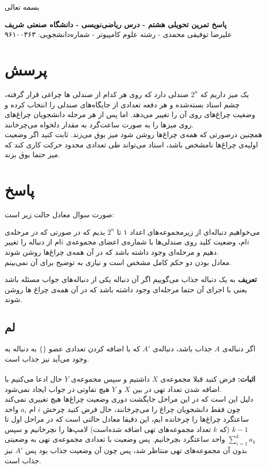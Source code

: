 \documentclass[12pt,a4paper]{article}
\begin{document}
\begin{center}
	بسمه تعالی
\end{center}
\begin{center}
	\textbf{پاسخ تمرین تحویلی هشتم - درس ریاضی‌نویسی - دانشگاه صنعتی شریف}
	\\
	علیرضا توفیقی محمدی - رشته علوم کامپیوتر - شماره‌دانشجویی: ۹۶۱۰۰۳۶۳
\end{center}
\section*{پرسش}
یک میز داریم که $2^n$ صندلی دارد که روی هر کدام از صندلی ها چراغی قرار گرفته، چشم استاد بسته‌شده و هر دفعه تعدادی از جایگاه‌های صندلی را انتخاب کرده و وضغیت چراغ‌های روی آن را تغییر می‌دهد. اما پس از هر مرحله دانشجویان چراغ‌های روی میزها را به صورت ساعت‌گرد به مقدار دلخواه می‌چرخانند.\\
همچنین درصورتی که همه‌ی چراغ‌ها روشن شود میز بوق می‌زند. ثابت کنید اگر وضعیت اولیه‌ی چراغ‌ها نامشخص باشد، استاد می‌تواند طی تعدادی محدود حرکت کاری کند که میز حتما بوق بزند.
\section*{پاسخ}
صورت سوال معادل حالت زیر است:

 می‌خواهیم دنباله‌ای از زیرمجموعه‌های اعداد ۱ تا 
$2^n$
بدیم که در صورتی که در مرحله‌ی $i$ام، وضعیت کلید روی صندلی‌ها با شماره‌ی اعضای مجموعه‌ی $i$ام از دنباله را تغییر دهیم و مرحله‌ای وجود داشته باشد که در آن همه‌ی چراغ‌ها روشن شوند.
\\
معادل بودن دو حکم کامل مشخص است و نیازی به توضیح برای آن نمی‌بینم.

\textbf{تعریف}
به یک دنباله جذاب می‌گوییم اگر آن دنباله یکی از دنباله‌های جواب مسئله باشد یعنی با اجرای آن حتما مرحله‌ای وجود داشته باشد که در آن همه‌ی چراغ ها روشن شوند.
\\
\subsection*{لم}
اگر دنباله‌ی $A$ جذاب باشد، دنباله‌ی $A'$ که با اضافه کردن تعدادی عضو $\{\}$ به دنباله به وجود می‌آید نیز جذاب است.
\\
\\
\textbf{اثبات:}
فرض کنید قبلا مجموعه‌ی $X$ داشتیم و سپس مجموعه‌ی $Y$ حال ادعا می‌کنیم با اضافه شدن تعداد تهی در بین $X$ و $Y$ هیچ تفاوتی در جواب ایجاد نمی‌شود.
\\
دلیل این است که در این مراحل جایگشت دوری وضعیت چراغ‌ها هیچ تغییری نمی‌کند چون فقط دانشجویان چراغ را می‌چرخانند، حال فرض کنید چرخش $i$ ام $a_i$ واحد ساعتگرد چراغ‌ها را چرخانده ایم، این دقیقا معادل حالتی است که در مراحل اول تا $k-1$ (که $k$ تعداد مجموعه‌های تهی اضافه شده‌است) لامپ‌ها را نچرخانیم و سپس
$\sum_{i=1}^k a_k$
واحد ساعتگرد بچرخانیم. پس وضعیت با تعدادی مجموعه‌ی تهی به وضعیتی بدون آن مجموعه‌های تهی منتاظر شد، پس چون آن وضعیت جذاب بود پس $A'$ نیز جذاب است.
\end{document}
